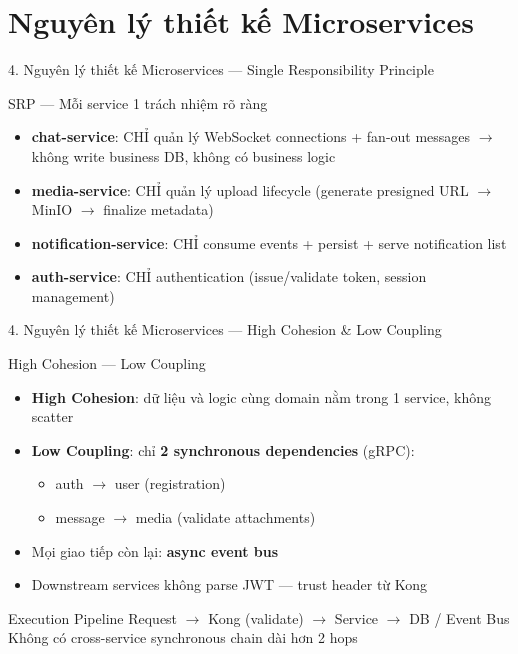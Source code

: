 \documentclass[aspectratio=169,compress]{beamer}
\begin{document}
\section{Nguyên lý thiết kế Microservices}

\begin{frame}{4. Nguyên lý thiết kế Microservices --- Single Responsibility Principle}
\begin{block}{SRP --- Mỗi service 1 trách nhiệm rõ ràng}
\begin{itemize}
  \item \textbf{chat-service}: CHỈ quản lý WebSocket connections + fan-out messages $\rightarrow$ không write business DB, không có business logic
  \item \textbf{media-service}: CHỈ quản lý upload lifecycle (generate presigned URL $\rightarrow$ MinIO $\rightarrow$ finalize metadata)
  \item \textbf{notification-service}: CHỈ consume events + persist + serve notification list
  \item \textbf{auth-service}: CHỈ authentication (issue/validate token, session management)
\end{itemize}
\end{block}
\end{frame}

\begin{frame}{4. Nguyên lý thiết kế Microservices --- High Cohesion \& Low Coupling}
\begin{block}{High Cohesion --- Low Coupling}
\begin{itemize}
  \item \textbf{High Cohesion}: dữ liệu và logic cùng domain nằm trong 1 service, không scatter
  \item \textbf{Low Coupling}: chỉ \textbf{2 synchronous dependencies} (gRPC):
    \begin{itemize}
      \item \small auth $\rightarrow$ user (registration)
      \item \small message $\rightarrow$ media (validate attachments)
    \end{itemize}
  \item Mọi giao tiếp còn lại: \textbf{async event bus}
  \item Downstream services không parse JWT --- trust header từ Kong
\end{itemize}
\end{block}
\begin{block}{Execution Pipeline}
Request $\rightarrow$ Kong (validate) $\rightarrow$ Service $\rightarrow$ DB / Event Bus\\
Không có cross-service synchronous chain dài hơn 2 hops
\end{block}
\end{frame}
\end{document}
